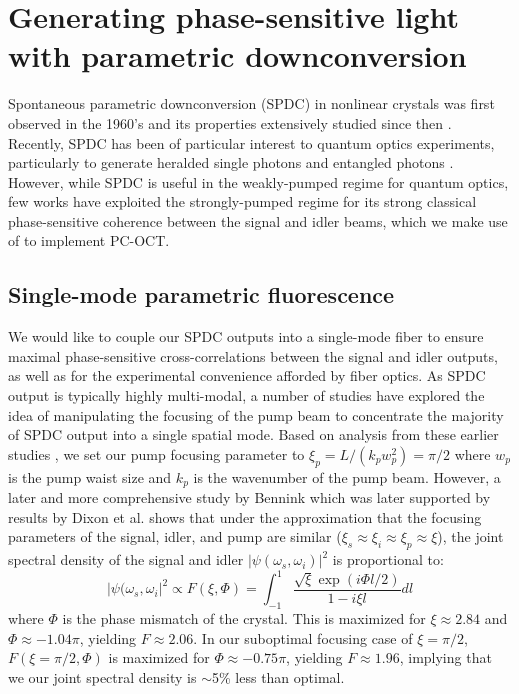 \section{Generating phase-sensitive light with parametric downconversion}

Spontaneous parametric downconversion (SPDC) in nonlinear crystals was first observed in the 1960's and its properties extensively studied since then \cite{louisell-spdc,harris-spdc,magde-spdc,akhmanov-spdc,byer-spdc,burnham-spdc,tapster-spdc}. Recently, SPDC has been of particular interest to quantum optics experiments, particularly to generate heralded single photons \cite{fasel-spdc,pittman-spdc} and entangled photons \cite{kurtsiefer-spdc,wong-spdc}. However, while SPDC is useful in the weakly-pumped regime for quantum optics, few works have exploited the strongly-pumped regime for its strong classical phase-sensitive coherence between the signal and idler beams, which we make use of to implement PC-OCT.

\subsection{Single-mode parametric fluorescence}

We would like to couple our SPDC outputs into a single-mode fiber to ensure maximal phase-sensitive cross-correlations between the signal and idler outputs, as well as for the experimental convenience afforded by fiber optics. As SPDC output is typically highly multi-modal, a number of studies \cite{ljunggren-focus,kurtsiefer-spdc,bovino-focus,bennink-focus,fedrizzi-focus,boyd-focus} have explored the idea of manipulating the focusing of the pump beam to concentrate the majority of SPDC output into a single spatial mode. Based on analysis from these earlier studies \cite{legouet-interferometry}, we set our pump focusing parameter to $\xi_p = L/(k_p w_p^2) = \pi/2$ where $w_p$ is the pump waist size and $k_p$ is the wavenumber of the pump beam. However, a later and more comprehensive study by Bennink \cite{bennink-optimal} which was later supported by results by Dixon et al. \cite{dixon-heralding} shows that under the approximation that the focusing parameters of the signal, idler, and pump are similar ($\xi_s \approx \xi_i \approx \xi_p \approx \xi$), the joint spectral density of the signal and idler $|\psi(\omega_s, \omega_i)|^2$ is proportional to:
\begin{equation}
|\psi(\omega_s, \omega_i|^2 \propto F(\xi,\Phi) = \int_{-1}^1 \frac{\sqrt{\xi} \exp(i\Phi l/2)}{1-i\xi l} dl
\end{equation}
where $\Phi$ is the phase mismatch of the crystal. This is maximized for $\xi \approx 2.84$ and $\Phi \approx -1.04\pi$, yielding $F \approx 2.06$. In our suboptimal focusing case of $\xi = \pi/2$, $F(\xi = \pi/2, \Phi)$ is maximized for $\Phi \approx -0.75\pi$, yielding $F \approx 1.96$, implying that we our joint spectral density is $\sim$5\% less than optimal.

